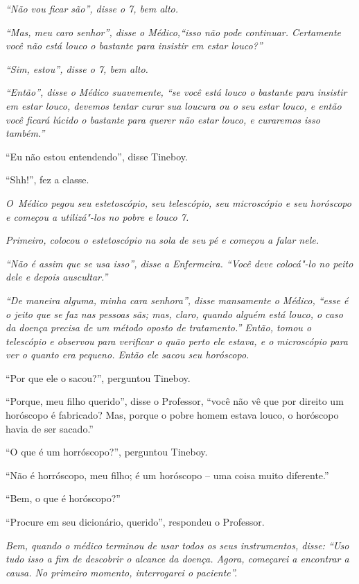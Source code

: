 \emph{``Não vou ficar são'', disse o 7, bem alto.}

\emph{``Mas, meu caro senhor'', disse o Médico,``isso não pode
continuar. Certamente você não está louco o bastante para insistir em
estar louco?''}

\emph{``Sim, estou'', disse o 7, bem alto.}

\emph{``Então'', disse o Médico suavemente, ``se você está louco o
bastante para insistir em estar louco, devemos tentar curar sua loucura
ou o seu estar louco, e então você ficará lúcido o bastante para querer
não estar louco, e curaremos isso também.''}

``Eu não estou entendendo'', disse Tineboy.

``Shh!'', fez a classe.

\emph{O~Médico pegou seu estetoscópio, seu telescópio, seu microscópio e
seu horóscopo e começou a utilizá"-los no pobre e louco 7.}

\emph{Primeiro, colocou o estetoscópio na sola de seu pé e começou a
falar nele.}

\emph{``Não é assim que se usa isso'', disse a Enfermeira. ``Você deve
colocá"-lo no peito dele e depois auscultar.''}

\emph{``De maneira alguma, minha cara senhora'', disse mansamente o
Médico, ``esse é o jeito que se faz nas pessoas sãs; mas, claro, quando
alguém está louco, o caso da doença precisa de um método oposto de
tratamento.'' Então, tomou o telescópio e observou para verificar o
quão perto ele estava, e o microscópio para ver o quanto era pequeno.
Então ele sacou seu horóscopo.}

``Por que ele o sacou?'', perguntou Tineboy.

``Porque, meu filho querido'', disse o Professor, ``você não vê que por
direito um horóscopo é fabricado? Mas, porque o pobre homem estava louco, o
horóscopo havia de ser sacado.''

``O que é um horróscopo?'', perguntou Tineboy.

``Não é horróscopo, meu filho; é um horóscopo -- uma coisa muito
diferente.''

``Bem, o que é horóscopo?''

``Procure em seu dicionário, querido'', respondeu o Professor.

\emph{Bem, quando o médico terminou de usar todos os seus instrumentos,
disse: ``Uso tudo isso a fim de descobrir o alcance da doença.
Agora, começarei a encontrar a causa. No primeiro momento, interrogarei
o paciente''.}

